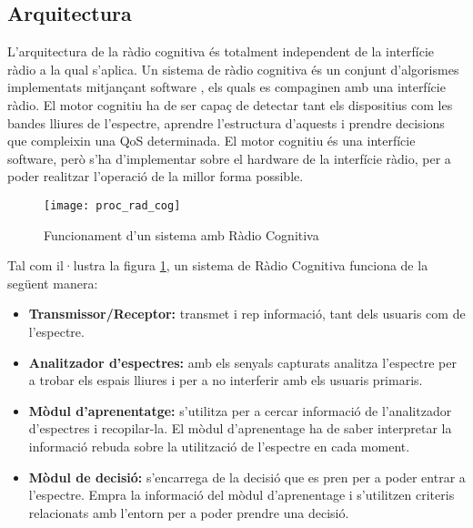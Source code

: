 \documentclass[10pt,journal,a4paper]{IEEEtran}
\begin{document}
\subsection{Arquitectura}
L'arquitectura de la ràdio cognitiva és totalment independent de la interfície ràdio a la qual s'aplica.
Un sistema de ràdio cognitiva és un conjunt d'algorismes implementats mitjançant software , els quals es compaginen amb una interfície ràdio.
El motor cognitiu ha de ser capaç de detectar tant els dispositius com les bandes lliures de l'espectre, aprendre l'estructura d'aquests i prendre decisions que compleixin una QoS determinada.
El motor cognitiu  és una interfície software, però s'ha d'implementar sobre el hardware de la interfície ràdio, per a poder realitzar l'operació de la millor forma possible.
\begin{figure}
  \centering
 \texttt{[image: proc\_rad\_cog]}
  \caption{Funcionament d'un sistema amb Ràdio Cognitiva \cite{renter_2011}}
  \label{fig:proc_rad}
\end{figure}

Tal com il·lustra la figura \ref{fig:proc_rad}, un sistema de Ràdio Cognitiva funciona de la següent manera:
\begin{itemize}
\item \textbf{Transmissor/Receptor:} transmet i rep informació, tant dels usuaris com de l'espectre.
\item \textbf{Analitzador d'espectres:} amb els senyals capturats analitza l'espectre per a trobar els espais lliures  i per a no interferir amb els usuaris primaris.
\item \textbf{Mòdul d'aprenentatge:} s'utilitza per a cercar informació de l'analitzador d'espectres i recopilar-la. El mòdul d'aprenentage ha de saber interpretar la informació rebuda sobre la utilització de l'espectre en cada moment.
\item \textbf{Mòdul de decisió:} s'encarrega de la decisió que es pren per a poder entrar a l'espectre. Empra la informació del mòdul d'aprenentage i s'utilitzen criteris relacionats amb l'entorn per a poder prendre una decisió. 
\end{itemize} 
\end{document}
